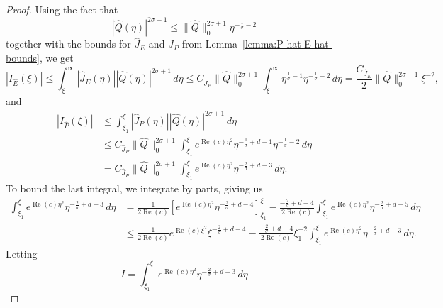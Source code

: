 \documentclass[11pt]{article}
\DeclareMathOperator{\real}{Re}
\begin{document}
\begin{proof}
  Using the fact that
  \begin{equation*}
    |\hat{Q}(\eta)|^{2\sigma + 1}
    \leq \|\hat{Q}\|_{0}^{2\sigma + 1}\eta^{-\frac{1}{\sigma} - 2}
  \end{equation*}
  together with the bounds for \(\hat{J}_{E}\) and \(\hat{J}_{P}\) from
  Lemma~\ref{lemma:P-hat-E-hat-bounds}, we get
  \begin{equation*}
    |I_{\hat{E}}(\xi)|
    \leq \int_{\xi}^{\infty} |\hat{J}_{E}(\eta)||\hat{Q}(\eta)|^{2\sigma + 1}\,d\eta
    \leq C_{\hat{J}_{E}}\|\hat{Q}\|_{0}^{2\sigma + 1}
    \int_{\xi}^{\infty}\eta^{\frac{1}{\sigma} - 1}\eta^{-\frac{1}{\sigma} - 2}\,d\eta
    = \frac{C_{\hat{J}_{E}}}{2}\|\hat{Q}\|_{0}^{2\sigma + 1}\xi^{-2},
  \end{equation*}
  and
  \begin{equation*}
    \begin{split}
      |I_{\hat{P}}(\xi)|
      &\leq \int_{\xi_{1}}^{\xi} |\hat{J}_{P}(\eta)||\hat{Q}(\eta)|^{2\sigma + 1}\,d\eta\\
      &\leq C_{\hat{J}_{P}}\|\hat{Q}\|_{0}^{2\sigma + 1}
        \int_{\xi_{1}}^{\xi} e^{\real(c)\eta^{2}}\eta^{-\frac{1}{\sigma} + d - 1}\eta^{-\frac{1}{\sigma} - 2}\,d\eta\\
      &= C_{\hat{J}_{P}}\|\hat{Q}\|_{0}^{2\sigma + 1}
        \int_{\xi_{1}}^{\xi} e^{\real(c)\eta^{2}}\eta^{-\frac{2}{\sigma} + d - 3}\,d\eta.
    \end{split}
  \end{equation*}
  To bound the last integral, we integrate by parts, giving us
  \begin{equation*}
    \begin{split}
      \int_{\xi_{1}}^{\xi}e^{\real(c)\eta^{2}}\eta^{-\frac{2}{\sigma} + d - 3}\,d\eta
      &= \frac{1}{2\real(c)}\left[e^{\real(c)\eta^{2}}\eta^{-\frac{2}{\sigma} + d - 4}\right]_{\xi_{1}}^{\xi}
      - \frac{-\frac{2}{\sigma} + d - 4}{2\real(c)}\int_{\xi_{1}}^{\xi}e^{\real(c)\eta^{2}}\eta^{-\frac{2}{\sigma} + d - 5}\,d\eta\\
      &\leq \frac{1}{2\real(c)}e^{\real(c)\xi^{2}}\xi^{-\frac{2}{\sigma} + d - 4}
      - \frac{-\frac{2}{\sigma} + d - 4}{2\real(c)}\xi_{1}^{-2}\int_{\xi_{1}}^{\xi}e^{\real(c)\eta^{2}}\eta^{-\frac{2}{\sigma} + d - 3}\,d\eta.
    \end{split}
  \end{equation*}
  Letting
  \begin{equation*}
    I = \int_{\xi_{1}}^{\xi}e^{\real(c)\eta^{2}}\eta^{-\frac{2}{\sigma} + d - 3}\,d\eta

\end{equation*}
\end{proof}
\end{document}
